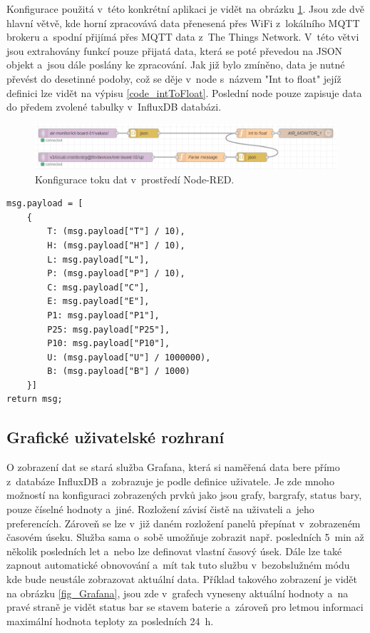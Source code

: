 Konfigurace použitá v~této konkrétní aplikaci je vidět na obrázku \ref{fig_NodeRED}. Jsou zde dvě hlavní větvě, kde horní zpracovává data přenesená přes WiFi z~lokálního MQTT brokeru a~spodní přijímá přes MQTT data z~The Things Network. V~této větvi jsou extrahovány funkcí pouze přijatá data, která se poté převedou na JSON objekt a~jsou dále poslány ke zpracování. Jak již bylo zmíněno, data je nutné převést do desetinné podoby, což se děje v~node s~názvem "Int to float"{} jejíž definici lze vidět na výpisu \ref{code_intToFloat}. Poslední node pouze zapisuje data do předem zvolené tabulky v~InfluxDB databázi.

\begin{figure}[h]
    \centering
    \includegraphics[width=\textwidth]{obrazky/nodered.png}
    \caption{Konfigurace toku dat v~prostředí Node-RED.}
    \label{fig_NodeRED}
\end{figure}

\noindent
\begin{minipage}{\linewidth}
\begin{lstlisting}[caption={Funkce pro převod naměřených dat do desetinné podoby.}, label={code_intToFloat}]
msg.payload = [
    {
        T: (msg.payload["T"] / 10),
        H: (msg.payload["H"] / 10),
        L: msg.payload["L"],
        P: (msg.payload["P"] / 10),
        C: msg.payload["C"],
        E: msg.payload["E"],
        P1: msg.payload["P1"],
        P25: msg.payload["P25"],
        P10: msg.payload["P10"],
        U: (msg.payload["U"] / 1000000),
        B: (msg.payload["B"] / 1000)
    }]
return msg;
\end{lstlisting}
\end{minipage}

\subsection{Grafické uživatelské rozhraní}

O zobrazení dat se stará služba Grafana, která si naměřená data bere přímo z~databáze InfluxDB a~zobrazuje je podle definice uživatele. Je zde mnoho možností na konfiguraci zobrazených prvků jako jsou grafy, bargrafy, status bary, pouze číselné hodnoty a~jiné. Rozložení závisí čistě na uživateli a~jeho preferencích. Zároveň se lze v~již daném rozložení panelů přepínat v~zobrazeném časovém úseku. Služba sama o~sobě umožňuje zobrazit např. posledních \SI{5}{\minute} až několik posledních let a~nebo lze definovat vlastní časový úsek. Dále lze také zapnout automatické obnovování a~mít tak tuto službu v~bezobslužném módu kde bude neustále zobrazovat aktuální data. Příklad takového zobrazení je vidět na obrázku \ref{fig_Grafana}, jsou zde v~grafech vyneseny aktuální hodnoty a~na pravé straně je vidět status bar se stavem baterie a~zároveň pro letmou informaci maximální hodnota teploty za posledních \SI{24}{\hour}.

